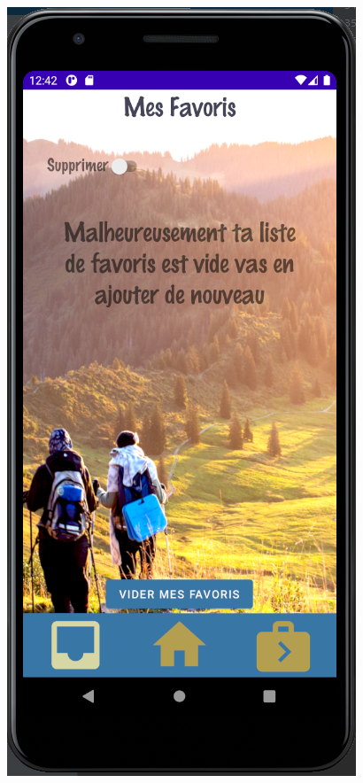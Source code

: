 \documentclass{article}
\begin{document}
\begin{minipage}{0.2\textwidth}
\includegraphics[width=\textwidth]{Mes_favoris_vide}

\end{minipage}
\end{document}

